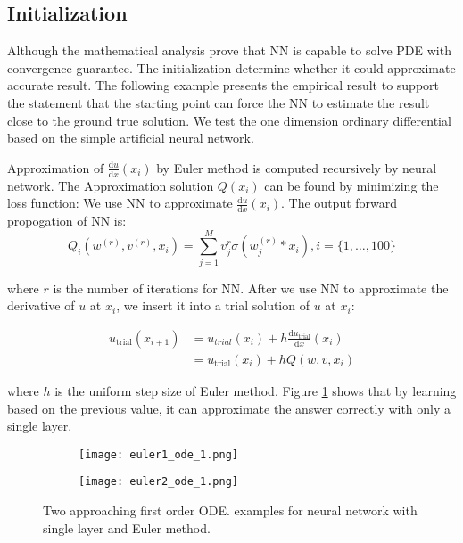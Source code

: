 \documentclass{article}
\begin{document}
\subsection{Initialization}
Although the mathematical analysis prove that NN is capable to solve PDE with convergence guarantee. 
The initialization determine whether it could approximate accurate result. 
The following example presents the empirical result to support the statement that the starting point can force the NN to estimate the result close to the ground true solution. 
We test the one dimension ordinary differential based on the simple artificial neural network. 

Approximation of $\frac{\mathrm{d}u}{\mathrm{d}x}(x_i)$ by Euler method is computed recursively by neural network. 
The Approximation solution $Q(x_i)$ can be found by minimizing the loss function:
We use NN to approximate $\frac{\mathrm{d}u}{\mathrm{d}x}(x_i)$. The output forward propogation of NN is:
\begin{equation}
Q_i (w^{(r)},v^{(r)},x_i)=  \sum_{j=1}^{M}  v_{j}^{r}\sigma (w_{j}^{(r)}*x_i), i = \{1, \dots, 100\}
\end{equation}

\medspace \noindent
where $r$ is the number of iterations for NN. 
\medspace \noindent
After we use NN to approximate the derivative of $u$ at $x_i$, we insert it into a trial solution of $u$ at $x_i$:  

\begin{equation}
\begin{aligned}
u_{\text{trial}}(x_{i+1}) &= u_{trial}(x_{i}) +h\frac{\mathrm{d}u_{\text{trial}}}{\mathrm{d}x}(x_i) \\
&=  u_{\text{trial}}(x_{i}) +hQ(w,v,x_i)
\end{aligned}
\end{equation}

\medspace \noindent
where $h$ is the uniform step size of Euler method.  
Figure \ref{fig:ode_d1} shows that by learning based on the previous value, it can approximate the answer correctly with only a single layer.
\begin{figure}[h]
	\begin{subfigure}{0.5\textwidth}
	\texttt{[image: euler1\_ode\_1.png]}
	\end{subfigure}
\begin{subfigure}{0.5\textwidth}
	\texttt{[image: euler2\_ode\_1.png]}
\end{subfigure}
	\caption{Two approaching first order ODE. examples for neural network with single layer and Euler method.}
	
\label{fig:ode_d1}
\end{figure}
\end{document}
